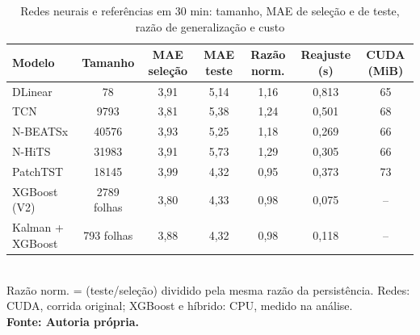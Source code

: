 \begin{table}[htb]
\caption{Redes neurais e referências em 30 min: tamanho, MAE de seleção e de teste, razão de generalização e custo}
\label{tab:v3-redes}
\centering
\footnotesize
\setlength{\tabcolsep}{3pt}
\renewcommand{\arraystretch}{1.15}
\begin{tabular}{|l|c|c|c|c|c|c|}
\hline
\textbf{Modelo} & \textbf{Tamanho} & \textbf{MAE seleção} & \textbf{MAE teste} & \textbf{Razão norm.} & \textbf{Reajuste (s)} & \textbf{CUDA (MiB)} \\
\hline
DLinear & 78 & 3{,}91 & 5{,}14 & 1{,}16 & 0{,}813 & 65 \\
TCN & 9793 & 3{,}81 & 5{,}38 & 1{,}24 & 0{,}501 & 68 \\
N-BEATSx & 40576 & 3{,}93 & 5{,}25 & 1{,}18 & 0{,}269 & 66 \\
N-HiTS & 31983 & 3{,}91 & 5{,}73 & 1{,}29 & 0{,}305 & 66 \\
PatchTST & 18145 & 3{,}99 & 4{,}32 & 0{,}95 & 0{,}373 & 73 \\
XGBoost (V2) & 2789 folhas & 3{,}80 & 4{,}33 & 0{,}98 & 0{,}075 & -- \\
Kalman + XGBoost & 793 folhas & 3{,}88 & 4{,}32 & 0{,}98 & 0{,}118 & -- \\
\hline
\end{tabular}\\
\footnotesize Razão norm. = (teste/seleção) dividido pela mesma razão da persistência. Redes: CUDA, corrida original; XGBoost e híbrido: CPU, medido na análise.\\
\textbf{\footnotesize Fonte: Autoria própria.}
\end{table}

